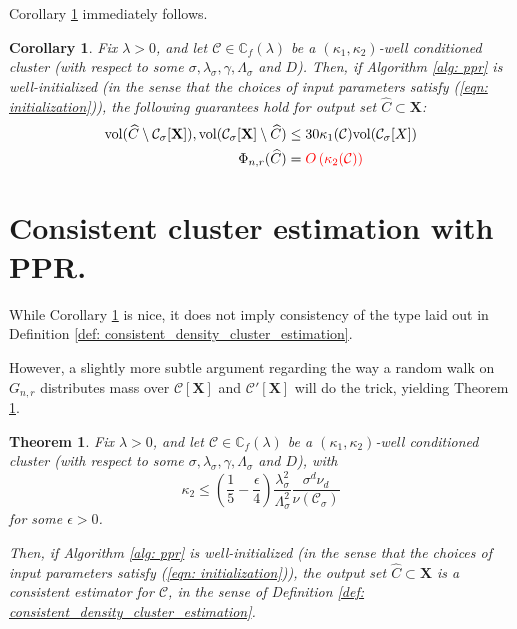 \documentclass{article}
\newcommand{\vol}{\mathrm{vol}}
\newcommand{\1}{\mathbf{1}}
\newcommand{\Xbf}{\mathbf{X}}
\newcommand{\Cbb}{\mathbb{C}}
\newcommand{\Cset}{\mathcal{C}}
\newcommand{\Csig}{\Cset_{\sigma}}
\theoremstyle{aldenthm}
\newtheorem{theorem}{Theorem}
\newtheorem{corollary}{Corollary}
\theoremstyle{remark}
\begin{document}
Corollary \ref{cor: ppr_cluster} immediately follows.
\begin{corollary}
	\label{cor: ppr_cluster}
	Fix $\lambda > 0$, and let $\Cset \in \Cbb_f(\lambda)$ be a $(\kappa_1,\kappa_2)$-well conditioned cluster (with respect to some $\sigma, \lambda_{\sigma}, \gamma, \Lambda_{\sigma}$ and $D$). Then, if Algorithm \ref{alg: ppr} is well-initialized (in the sense that the choices of input parameters satisfy (\ref{eqn: initialization})), the following guarantees hold for output set $\widehat{C} \subset \Xbf$:
	\begin{align*}
	\vol(\widehat{C} \setminus \Csig[\Xbf]), \vol(\Csig[\Xbf] \setminus \widehat{C})  & \leq 30 \kappa_1(\Cset) \vol(\Csig[X]) \\
	\Phi_{n,r}(\widehat{C}) & = \textcolor{red}{O\left(\kappa_2(\Cset)\right)}
	\end{align*}
\end{corollary}

\section{Consistent cluster estimation with PPR.}
\label{sec: consistent_cluster_estimation_with_ppr}
While Corollary \ref{cor: ppr_cluster} is nice, it does not imply consistency of the type laid out in Definition \ref{def: consistent_density_cluster_estimation}.

However, a slightly more subtle argument regarding the way a random walk on $G_{n,r}$ distributes mass over $\Cset[\Xbf]$ and $\Cset'[\Xbf]$ will do the trick, yielding Theorem \ref{thm: consistent_recovery_of_density_clusters}. 
\begin{theorem}
\label{thm: consistent_recovery_of_density_clusters}
Fix $\lambda > 0$, and let $\Cset \in \Cbb_f(\lambda)$ be a $(\kappa_1,\kappa_2)$-well conditioned cluster (with respect to some $\sigma, \lambda_{\sigma}, \gamma, \Lambda_{\sigma}$ and $D$), with
\begin{equation}
\label{eqn: kappa2_ub}
\kappa_2 \leq \left(\frac{1}{5} - \frac{\epsilon}{4}\right) \frac{\lambda_{\sigma}^2}{\Lambda_{\sigma}^2} \frac{\sigma^d \nu_d}{\nu(\Csig)}
\end{equation}
for some $\epsilon > 0$.

Then, if Algorithm \ref{alg: ppr} is well-initialized (in the sense that the choices of input parameters satisfy (\ref{eqn: initialization})), the output set $\widehat{C} \subset \Xbf$ is a consistent estimator for $\Cset$, in the sense of Definition \ref{def: consistent_density_cluster_estimation}.
\end{theorem}
\end{document}
